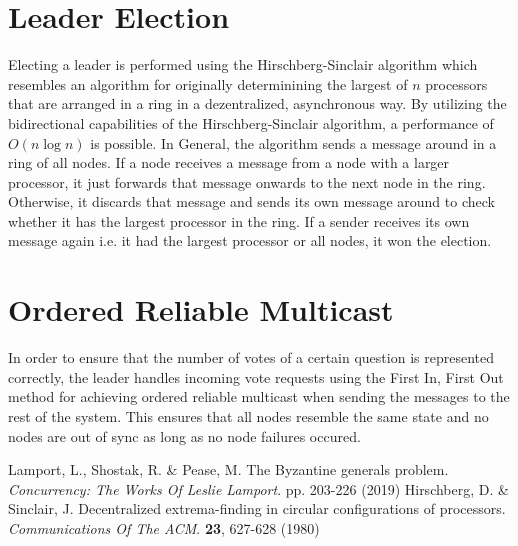 \documentclass[runningheads]{llncs}
\begin{document}
\section{Leader Election}

Electing a leader is performed using the Hirschberg-Sinclair algorithm which resembles an algorithm for originally determinining the largest of $n$ processors that are arranged in a ring in a dezentralized, asynchronous way.
By utilizing the bidirectional capabilities of the Hirschberg-Sinclair algorithm, a performance of $O(n\log{}n)$ is possible.\cite{hirschberg1980decentralized}
In General, the algorithm sends a message around in a ring of all nodes.
If a node receives a message from a node with a larger processor, it just forwards that message onwards to the next node in the ring.
Otherwise, it discards that message and sends its own message around to check whether it has the largest processor in the ring.
If a sender receives its own message again i.e. it had the largest processor or all nodes, it won the election.

\section{Ordered Reliable Multicast}

In order to ensure that the number of votes of a certain question is represented correctly,
the leader handles incoming vote requests using the First In, First Out method for achieving ordered reliable multicast when sending the messages to the rest of the system.
This ensures that all nodes resemble the same state and no nodes are out of sync as long as no node failures occured.


\begin{thebibliography}{8}
Lamport, L., Shostak, R. \& Pease, M. The Byzantine generals problem. {\em Concurrency: The Works Of Leslie Lamport}. pp. 203-226 (2019)
Hirschberg, D. \& Sinclair, J. Decentralized extrema-finding in circular configurations of processors. {\em Communications Of The ACM}. \textbf{23}, 627-628 (1980)
\end{thebibliography}
\end{document}
